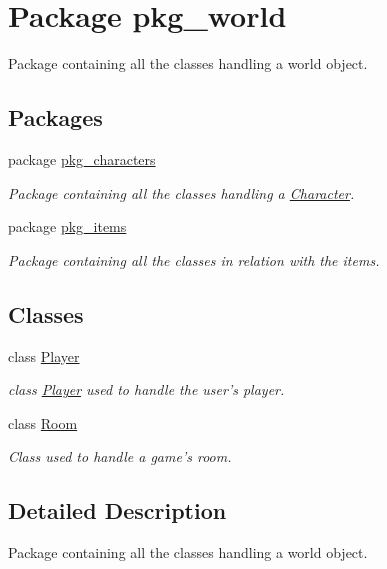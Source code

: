 \hypertarget{namespacepkg__world}{\section{Package pkg\-\_\-world}
\label{namespacepkg__world}
}


Package containing all the classes handling a world object.  


\subsection*{Packages}
\begin{DoxyCompactItemize}
\item 
package \hyperlink{namespacepkg__world_1_1pkg__characters}{pkg\-\_\-characters}
\begin{DoxyCompactList}\small\item\em Package containing all the classes handling a \hyperlink{classpkg__world_1_1pkg__characters_1_1Character}{Character}. \end{DoxyCompactList}\item 
package \hyperlink{namespacepkg__world_1_1pkg__items}{pkg\-\_\-items}
\begin{DoxyCompactList}\small\item\em Package containing all the classes in relation with the items. \end{DoxyCompactList}\end{DoxyCompactItemize}
\subsection*{Classes}
\begin{DoxyCompactItemize}
\item 
class \hyperlink{classpkg__world_1_1Player}{Player}
\begin{DoxyCompactList}\small\item\em class \hyperlink{classpkg__world_1_1Player}{Player} used to handle the user's player. \end{DoxyCompactList}\item 
class \hyperlink{classpkg__world_1_1Room}{Room}
\begin{DoxyCompactList}\small\item\em Class used to handle a game's room. \end{DoxyCompactList}\end{DoxyCompactItemize}


\subsection{Detailed Description}
Package containing all the classes handling a world object. 
